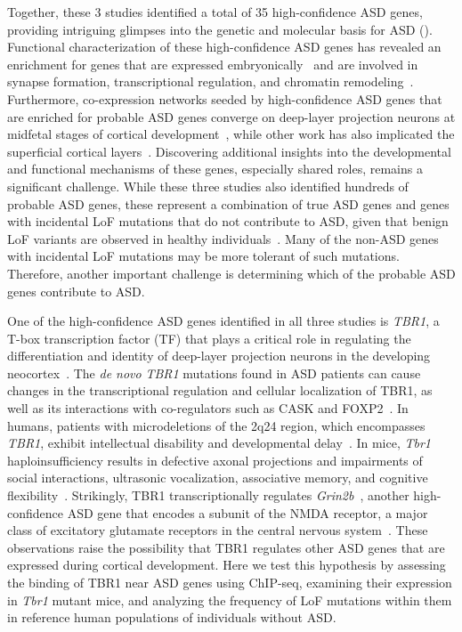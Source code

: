 Together, these 3 studies identified a total of 35 high-confidence ASD
genes, providing intriguing glimpses into the genetic and molecular
basis for ASD (). Functional characterization of these
high-confidence ASD genes has revealed an enrichment for genes that are
expressed embryonically~\citep{Iossifov:2014if} and are involved in
synapse formation, transcriptional regulation, and chromatin remodeling~\citep{DeRubeis:2014cw}. Furthermore, co-expression networks seeded by
high-confidence ASD genes that are enriched for probable ASD genes
converge on deep-layer projection neurons at midfetal stages of cortical
development~\citep{Willsey:2013bd}, while other work has also implicated
the superficial cortical layers~\citep{Parikshak:2013di}. Discovering
additional insights into the developmental and functional mechanisms of
these genes, especially shared roles, remains a significant challenge.
While these three studies also identified hundreds of probable ASD
genes, these represent a combination of true ASD genes and genes with
incidental LoF mutations that do not contribute to ASD, given that
benign LoF variants are observed in healthy individuals~\citep{MacArthur:2010ih}. Many of the non-ASD genes with incidental LoF
mutations may be more tolerant of such mutations. Therefore, another
important challenge is determining which of the probable ASD genes
contribute to ASD.

One of the high-confidence ASD genes identified in all three studies is
\emph{TBR1}, a T-box transcription factor (TF) that plays a critical
role in regulating the differentiation and identity of deep-layer
projection neurons in the developing neocortex~\citep{Hevner:2001wq, Bedogni:2010ew, McKenna:2011ew, Han:2011fs, Leone:2008ir}. The \emph{de novo} \emph{TBR1} mutations found in ASD
patients can cause changes in the transcriptional regulation and
cellular localization of TBR1, as well as its interactions with
co-regulators such as CASK and FOXP2~\citep{Deriziotis:2014ku}. In humans, patients with microdeletions of the
2q24 region, which encompasses \emph{TBR1}, exhibit intellectual
disability and developmental delay~\citep{Traylor:2012ga}. In mice,
\emph{Tbr1} haploinsufficiency results in defective axonal projections
and impairments of social interactions, ultrasonic vocalization,
associative memory, and cognitive flexibility~\citep{Huang:2014bz}.
Strikingly, TBR1 transcriptionally regulates \emph{Grin2b}~\citep{Chuang:2014bc}, another high-confidence ASD gene that encodes a subunit of
the NMDA receptor, a major class of excitatory glutamate receptors in
the central nervous system~\citep{Dingledine:1999up}. These observations
raise the possibility that TBR1 regulates other ASD genes that are
expressed during cortical development. Here we test this hypothesis by
assessing the binding of TBR1 near ASD genes using ChIP-seq, examining
their expression in \emph{Tbr1} mutant mice, and analyzing the frequency
of LoF mutations within them in reference human populations of
individuals without ASD.

